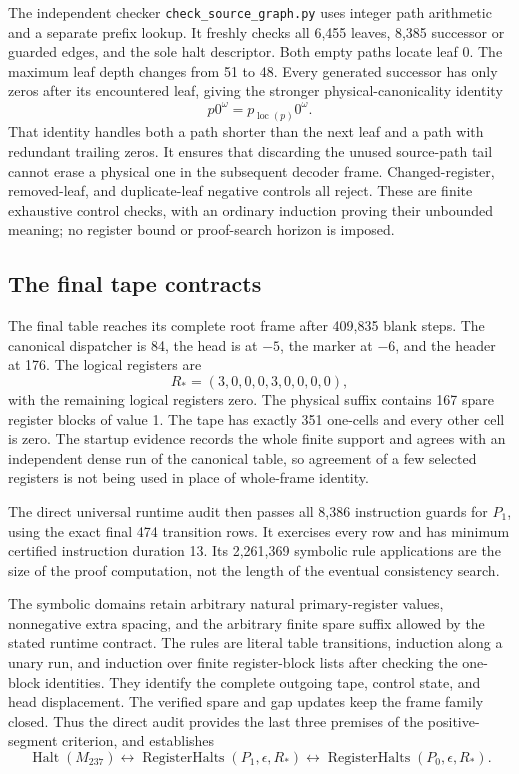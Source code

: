 The independent checker \texttt{check\_source\_graph.py} uses integer
path arithmetic and a separate prefix lookup.  It freshly checks all
6,455 leaves, 8,385 successor or guarded edges, and the sole halt
descriptor.  Both empty paths locate leaf 0.  The maximum leaf depth
changes from 51 to 48.  Every generated successor has only zeros after
its encountered leaf, giving the stronger physical-canonicality identity
\[
 p0^\omega=p_{\operatorname{loc}(p)}0^\omega.
\]
That identity handles both a path shorter than the next leaf and a path
with redundant trailing zeros.  It ensures that discarding the unused
source-path tail cannot erase a physical one in the subsequent decoder
frame.  Changed-register, removed-leaf, and duplicate-leaf negative
controls all reject.  These are finite exhaustive control checks, with
an ordinary induction proving their unbounded meaning; no register bound
or proof-search horizon is imposed.

\subsection{The final tape contracts}

The final table reaches its complete root frame after 409,835 blank
steps.  The canonical dispatcher is 84, the head is at $-5$, the marker
at $-6$, and the header at 176.  The logical registers are
\[
 R_*=(3,0,0,0,3,0,0,0,0),
\]
with the remaining logical registers zero.  The physical suffix contains
167 spare register blocks of value 1.  The tape has exactly 351 one-cells
and every other cell is zero.  The startup evidence records the whole
finite support and agrees with an independent dense run of the canonical
table, so agreement of a few selected registers is not being used in
place of whole-frame identity.

The direct universal runtime audit then passes all 8,386 instruction
guards for $P_1$, using the exact final 474 transition rows.  It exercises
every row and has minimum certified instruction duration 13.  Its
2,261,369 symbolic rule applications are the size of the proof computation,
not the length of the eventual consistency search.

The symbolic domains retain arbitrary natural primary-register values,
nonnegative extra spacing, and the arbitrary finite spare suffix allowed
by the stated runtime contract.  The rules are literal table transitions,
induction along a unary run, and induction over finite register-block
lists after checking the one-block identities.  They identify the complete
outgoing tape, control state, and head displacement.  The verified spare
and gap updates keep the frame family closed.  Thus the direct audit
provides the last three premises of the positive-segment criterion, and
establishes
\[
 \operatorname{Halt}(M_{237})
 \longleftrightarrow
 \operatorname{RegisterHalts}(P_1,\epsilon,R_*)
 \longleftrightarrow
 \operatorname{RegisterHalts}(P_0,\epsilon,R_*).
\]


